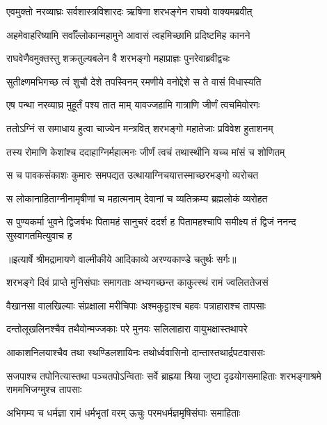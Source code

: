 \twolineshloka
{एवमुक्तो नरव्याघ्रः सर्वशास्त्रविशारदः}
{ऋषिणा शरभङ्गेन राघवो वाक्यमब्रवीत्} %

\twolineshloka
{अहमेवाहरिष्यामि सर्वाँल्लोकान्महामुने}
{आवासं त्वहमिच्छामि प्रदिष्टमिह कानने} %

\twolineshloka
{राघवेणैवमुक्तस्तु शक्रतुल्यबलेन वै}
{शरभङ्गो महाप्राज्ञः पुनरेवाब्रवीद्वचः} %

\twolineshloka
{सुतीक्ष्णमभिगच्छ त्वं शुचौ देशे तपस्विनम्}
{रमणीये वनोद्देशे स ते वासं विधास्यति} %

\twolineshloka
{एष पन्था नरव्याघ्र मुहूर्तं पश्य तात माम्}
{यावज्जहामि गात्राणि जीर्णं त्वचमिवोरगः} %

\twolineshloka
{ततोऽग्निं स समाधाय हुत्वा चाज्येन मन्त्रवित्}
{शरभङ्गो महातेजाः प्रविवेश हुताशनम्} %

\twolineshloka
{तस्य रोमाणि केशांश्च ददाहाग्निर्महात्मनः}
{जीर्णं त्वचं तथास्थीनि यच्च मांसं च शोणितम्} %

\twolineshloka
{स च पावकसंकाशः कुमारः समपद्यत}
{उत्थायाग्निचयात्तस्माच्छरभङ्गो व्यरोचत} %

\twolineshloka
{स लोकानाहिताग्नीनामृषीणां च महात्मनाम्}
{देवानां च व्यतिक्रम्य ब्रह्मलोकं व्यरोहत} %

\fourlineindentedshloka
{स पुण्यकर्मा भुवने द्विजर्षभः}
{ पितामहं सानुचरं ददर्श ह}
{पितामहश्चापि समीक्ष्य तं द्विजं}
{ ननन्द सुस्वागतमित्युवाच ह} %


{॥इत्यार्षे श्रीमद्रामायणे वाल्मीकीये आदिकाव्ये अरण्यकाण्डे चतुर्थः सर्गः॥}


\twolineshloka
{शरभङ्गे दिवं प्राप्ते मुनिसंघाः समागताः}
{अभ्यगच्छन्त काकुत्स्थं रामं ज्वलिततेजसं} %

\twolineshloka
{वैखानसा वालखिल्याः संप्रक्षाला मरीचिपाः}
{अश्मकुट्टाश्च बहवः पत्राहाराश्च तापसाः} %

\twolineshloka
{दन्तोलूखलिनश्चैव तथैवोन्मज्जकाः परे}
{मुनयः सलिलाहारा वायुभक्षास्तथापरे} %

\twolineshloka
{आकाशनिलयाश्चैव तथा स्थण्डिलशायिनः}
{तथोर्ध्ववासिनो दान्तास्तथार्द्रपटवाससः} %

\threelineshloka
{सजपाश्च तपोनित्यास्तथा पञ्चतपोऽन्विताः}
{सर्वे ब्राह्म्या श्रिया जुष्टा दृढयोगसमाहिताः}
{शरभङ्गाश्रमे राममभिजग्मुश्च तापसाः} %

\twolineshloka
{अभिगम्य च धर्मज्ञा रामं धर्मभृतां वरम्}
{ऊचुः परमधर्मज्ञमृषिसंघाः समाहिताः} %

